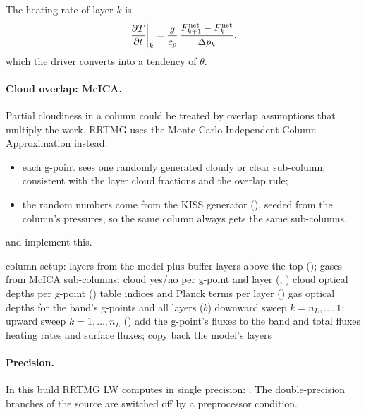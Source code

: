 The heating rate of layer $k$ is
\begin{equation}
  \left.\frac{\partial T}{\partial t}\right|_k = \frac{g}{c_p}\,\frac{F^{\mathrm{net}}_{k+1} - F^{\mathrm{net}}_{k}}{\Delta p_k},
\end{equation}
which the driver converts into a tendency of $\theta$.

\paragraph{Cloud overlap: McICA.} Partial cloudiness in a column could be treated by overlap assumptions that
multiply the work. RRTMG uses the Monte Carlo Independent Column Approximation \citep{pincus2003} instead:
\begin{itemize}
  \item each g-point sees one randomly generated cloudy or clear sub-column, consistent with the layer cloud fractions
    and the overlap rule;
  \item the random numbers come from the KISS generator (), seeded from the column's pressures, so the
    same column always gets the same sub-columns.
\end{itemize}
 and  implement this.

\begin{algorithm}[ht]
\caption{One RRTMG longwave column,  (simplified).}
\label{alg:rrtmg}
\begin{algorithmic}[1]
\State column setup: layers from the model plus buffer layers above the top (); gases from 
\State McICA sub-columns: cloud yes/no per g-point and layer (, )
\State cloud optical depths per g-point ()
\State table indices and Planck terms per layer ()
  \State gas optical depths for the band's g-points and all layers ($b$)
\EndFor
{} 
  \State downward sweep $k = n_L, \dots, 1$; upward sweep $k = 1, \dots, n_L$ ()
  \State add the g-point's fluxes to the band and total fluxes
\EndFor
\State heating rates and surface fluxes; copy back the model's layers
\end{algorithmic}
\end{algorithm}

\paragraph{Precision.} In this build RRTMG LW computes in single precision: . The
double-precision branches of the source are switched off by a preprocessor condition.

